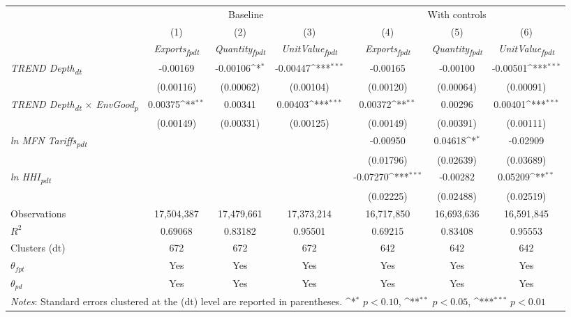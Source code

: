 {
\def\sym#1{\ifmmode^{#1}\else\(^{#1}\)\fi}
\begin{tabular}{l*{6}{c}}
\toprule
&\multicolumn{3}{c}{Baseline}&\multicolumn{3}{c}{With controls}\\\cmidrule(lr){2-4}\cmidrule(lr){5-7}
&(1)&(2)&(3)&(4)&(5)&(6)\\
&\textit{Exports\textsubscript{fpdt}}&\textit{Quantity\textsubscript{fpdt}}&\textit{UnitValue\textsubscript{fpdt}}&\textit{Exports\textsubscript{fpdt}}&\textit{Quantity\textsubscript{fpdt}}&\textit{UnitValue\textsubscript{fpdt}}\\
\midrule
\textit{TREND Depth\textsubscript{dt}} & -0.00169 & -0.00106\sym{*} & -0.00447\sym{***} & -0.00165 & -0.00100 & -0.00501\sym{***}\\
 & (0.00116) & (0.00062) & (0.00104) & (0.00120) & (0.00064) & (0.00091)\\
\addlinespace
\textit{TREND Depth\textsubscript{dt} $\times$ EnvGood\textsubscript{p}} & 0.00375\sym{**} & 0.00341 & 0.00403\sym{***} & 0.00372\sym{**} & 0.00296 & 0.00401\sym{***}\\
 & (0.00149) & (0.00331) & (0.00125) & (0.00149) & (0.00391) & (0.00111)\\
\addlinespace
\textit{ln MFN Tariffs\textsubscript{pdt}} &  &  &  & -0.00950 & 0.04618\sym{*} & -0.02909\\
 &  &  &  & (0.01796) & (0.02639) & (0.03689)\\
\addlinespace
\textit{ln HHI\textsubscript{pdt}} &  &  &  & -0.07270\sym{***} & -0.00282 & 0.05209\sym{**}\\
 &  &  &  & (0.02225) & (0.02488) & (0.02519)\\
\midrule
Observations & 17,504,387 & 17,479,661 & 17,373,214 & 16,717,850 & 16,693,636 & 16,591,845\\
$R^{2}$ & 0.69068 & 0.83182 & 0.95501 & 0.69215 & 0.83408 & 0.95553\\
Clusters (dt) & 672 & 672 & 672 & 642 & 642 & 642\\
$\theta_{fpt}$ & Yes & Yes & Yes & Yes & Yes & Yes\\
$\theta_{pd}$ & Yes & Yes & Yes & Yes & Yes & Yes\\
\bottomrule
\multicolumn{7}{l}{\footnotesize \textit{Notes}: Standard errors clustered at the (dt) level are reported in parentheses. \sym{*} \(p<0.10\), \sym{**} \(p<0.05\), \sym{***} \(p<0.01\)}\\
\end{tabular}
}
